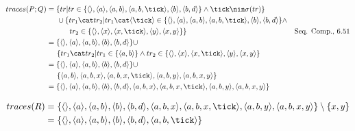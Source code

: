 \documentclass{scrreprt}
\begin{document}
\begin{align*}
  traces(P; Q) &= \{ tr | tr \in \{ \langle \rangle, \langle a \rangle, \langle a, b \rangle, \langle a, b, \tick \rangle, \langle b \rangle, \langle b, d \rangle \} \wedge \tick \nin \sigma(tr) \} \\
               &\hspace{0.5cm} \cup \{ tr_1 \cat tr_2 | tr_1 \cat \langle \tick \rangle \in \{ \langle \rangle, \langle a \rangle, \langle a, b \rangle, \langle a, b, \tick \rangle, \langle b \rangle, \langle b, d \rangle \} \wedge \\
               &\hspace{1.1cm} tr_2 \in \{ \langle \rangle, \langle x \rangle, \langle x, \tick \rangle, \langle y \rangle, \langle x, y \rangle \} \} & \text{Seq. Comp., 6.51} \\
               &= \{ \langle \rangle, \langle a \rangle, \langle a, b \rangle, \langle b \rangle, \langle b, d \rangle \} \cup \\
               &\hspace{0.5cm} \{ tr_1 \cat tr_2 | tr_1 \in \{ \langle a, b \rangle \} \wedge tr_2 \in \{ \langle \rangle, \langle x \rangle, \langle x, \tick \rangle, \langle y \rangle, \langle x, y \rangle \} \\
               &= \{ \langle \rangle, \langle a \rangle, \langle a, b \rangle, \langle b \rangle, \langle b, d \rangle \} \cup \\
               &\hspace{0.5cm} \{ \langle a, b \rangle, \langle a, b, x \rangle, \langle a, b, x, \tick \rangle, \langle a, b, y \rangle, \langle a, b, x, y \rangle \} \\
               &= \{ \langle \rangle, \langle a \rangle, \langle a, b \rangle, \langle b \rangle, \langle b, d \rangle, \langle a, b, x \rangle, \langle a, b, x, \tick \rangle, \langle a, b, y \rangle, \langle a, b, x, y \rangle \}
\end{align*}

\begin{align*}
  traces(R) &= \{ \langle \rangle, \langle a \rangle, \langle a, b \rangle, \langle b \rangle, \langle b, d \rangle, \langle a, b, x \rangle, \langle a, b, x, \tick \rangle, \langle a, b, y \rangle, \langle a, b, x, y \rangle \} \setminus \{ x, y \} \\
            &= \{ \langle \rangle, \langle a \rangle, \langle a, b \rangle, \langle b \rangle, \langle b, d \rangle, \langle a, b, \tick \rangle \} 
\end{align*}
\end{document}
